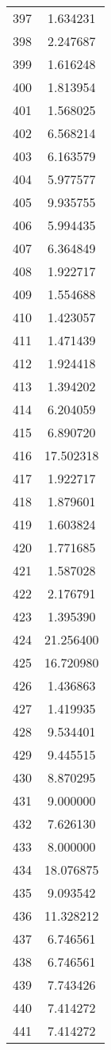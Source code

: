 \documentclass[12pt]{article}
\begin{document}
\begin{longtable}{@{}cc@{}}
397 & 1.634231 \\
398 & 2.247687 \\
399 & 1.616248 \\
400 & 1.813954 \\
401 & 1.568025 \\
402 & 6.568214 \\
403 & 6.163579 \\
404 & 5.977577 \\
405 & 9.935755 \\
406 & 5.994435 \\
407 & 6.364849 \\
408 & 1.922717 \\
409 & 1.554688 \\
410 & 1.423057 \\
411 & 1.471439 \\
412 & 1.924418 \\
413 & 1.394202 \\
414 & 6.204059 \\
415 & 6.890720 \\
416 & 17.502318 \\
417 & 1.922717 \\
418 & 1.879601 \\
419 & 1.603824 \\
420 & 1.771685 \\
421 & 1.587028 \\
422 & 2.176791 \\
423 & 1.395390 \\
424 & 21.256400 \\
425 & 16.720980 \\
426 & 1.436863 \\
427 & 1.419935 \\
428 & 9.534401 \\
429 & 9.445515 \\
430 & 8.870295 \\
431 & 9.000000 \\
432 & 7.626130 \\
433 & 8.000000 \\
434 & 18.076875 \\
435 & 9.093542 \\
436 & 11.328212 \\
437 & 6.746561 \\
438 & 6.746561 \\
439 & 7.743426 \\
440 & 7.414272 \\
441 & 7.414272 \\

\end{longtable}
\end{document}

